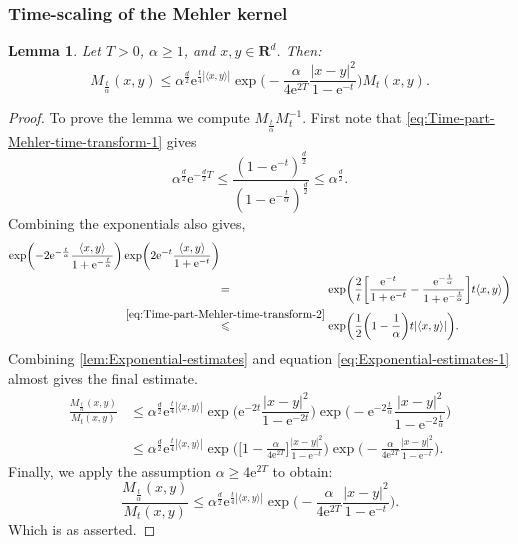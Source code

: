 \documentclass[a4paper,oneside,10pt]{amsproc}
\theoremstyle{plain}
\newtheorem{lemma}{Lemma}
\theoremstyle{remark}
\newcommand{\la}{\langle}
\newcommand{\ra}{\rangle}
\renewcommand{\leq}{\leqslant}
\renewcommand{\leq}{\leqslant}
\renewcommand{\geq}{\geqslant}
\newcommand{\R}{\mathbf R}
\newcommand{\e}{\mathrm{e}} %
\renewcommand{\leq}{\leqslant}%
\renewcommand{\geq}{\geqslant}%
\begin{document}
\subsubsection{Time-scaling of the Mehler kernel}
\begin{lemma}\label{lem:Kernel-estimates-1}
 Let $T > 0$, $\alpha \geq 1$, and $x, y \in \R^d$. Then:
  \begin{equation}
    \label{eq:Kernel-lemma-1-estimate} 
    M_{\frac{t}{\alpha}}(x, y) \leq \alpha^{\frac{d}2}
    \e^{\frac{t}4 |\la x, y \ra|} \exp\biggl (-\frac{\alpha}{4
      \e^{2 T}} \frac{|x - y|^2}{1 - \e^{-t}} \biggr ) M_{t}(x,
    y).
  \end{equation}
\end{lemma}
\begin{proof}
  To prove the lemma we compute $M_{\frac{t}{\alpha}} M_t^{-1}$.
  First note that \eqref{eq:Time-part-Mehler-time-transform-1} gives
  \begin{equation*}
        \alpha^{\frac{d}2} \e^{-\frac{d}2 T} \leq \frac{(1 - \e^{-t})^{\frac{d}2}}{(1 -
          \e^{-\frac{t}{\alpha}})^{\frac{d}2}} \leq \alpha^{\frac{d}2}.
  \end{equation*}
  Combining the exponentials also gives,
  \begin{align*}
    \exp \biggl (-2\e^{-\frac{t}\alpha} \frac{\la x, y \ra}{1 + \e^{-\frac{t}{\alpha}}}
    \biggr ) &\exp \biggl (2 \e^{-t} \frac{\la x, y \ra}{1 + \e^{-t}}
    \biggr )\\
    &\stackrel{\phantom{\eqref{eq:Time-part-Mehler-time-transform-2}}}{=}
    \exp\biggl (\frac2{t}\biggl[\frac{\e^{-t}}{1 + \e^{-t}} - \frac{\e^{-\frac{t}\alpha}}{1 +
      \e^{-\frac{t}{\alpha}}} \biggr] t \la x, y \ra \biggr)\\
    &\stackrel{\eqref{eq:Time-part-Mehler-time-transform-2}}{\leq}
    \exp\biggl (\frac{1}{2} \biggl(1 - \frac1\alpha \biggr) t |\la x, y \ra| \biggr).
  \end{align*}
  Combining \autoref{lem:Exponential-estimates} and equation
  \eqref{eq:Exponential-estimates-1} almost gives the final estimate.
  \begin{align*}
    \frac{M_{\frac{t}{\alpha}}(x, y)}{M_{t}(x, y)} &\leq
    \alpha^{\frac{d}2} \e^{\frac{t}4 |\la x, y \ra|}
    \exp\biggl(\e^{-2t} \dfrac{|x - y|^2}{1 - \e^{-2t}} \biggr)
    \exp\biggl(-\e^{-2\frac{t}{\alpha}} \dfrac{|x - y|^2}{1 -
      \e^{-2\frac{t}{\alpha}}}  \biggr)\\ 
    &\leq \alpha^{\frac{d}2} \e^{\frac{t}4 |\la x, y \ra|} \exp
    \biggl (\biggl[1 -\frac{\alpha}{4\e^{2 T}} \biggr]
    \frac{|x - y|^2}{1 - \e^{-t}} \biggr ) \exp \biggl
    (-\frac{\alpha}{4\e^{2 T}} \frac{|x - y|^2}{1 - \e^{-t}} \biggr
    ).
  \end{align*}
  Finally, we apply the assumption $\alpha \geq 4 \e^{2 T}$ to obtain:
  \begin{equation*}
    \frac{M_{\frac{t}{\alpha}}(x, y)}{M_t(x, y)} \leq \alpha^{\frac{d}2}
    \e^{\frac{t}4 |\la x, y \ra|} \exp\biggl(-\frac{\alpha}{4\e^{2T}}
    \frac{|x - y|^2}{1 - \e^{-t}} \biggr).
  \end{equation*}
  Which is as asserted.
\end{proof}
\end{document}
